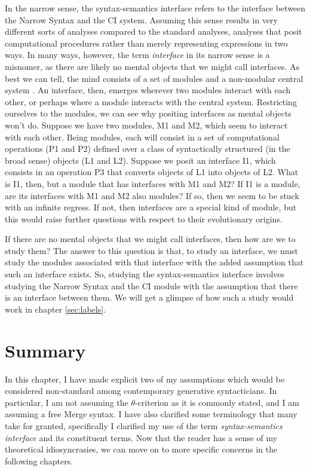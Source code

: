\documentclass[MilwayThesis]{subfiles}
\begin{document}
In the narrow sense, the syntax-semantics interface refers to the interface between the Narrow Syntax and the CI system.
Assuming this sense results in very different sorts of analyses compared to the standard analyses, analyses that posit computational procedures rather than merely representing expressions in two ways.
In many ways, however, the term \textit{interface} in its narrow sense is a misnomer, as there are likely no mental objects that we might call interfaces.
As best we can tell, the mind consists of a set of modules and a non-modular central system \parencite{fodor1983modularity,fodor2001mind}.
An interface, then, emerges wherever two modules interact with each other, or perhaps where a module interacts with the central system.
Restricting ourselves to the modules, we can see why positing interfaces as mental objects won't do.
Suppose we have two modules, M1 and M2, which seem to interact with each other.
Being modules, each will consist in a set of computational operations (P1 and P2) defined over a class of syntactically structured (in the broad sense) objects (L1 and L2).
Suppose we posit an interface I1, which consists in an operation P3 that converts objects of L1 into objects of L2.
What is I1, then, but a module that has interfaces with M1 and M2?
If I1 is a module, are its interfaces with M1 and M2 also modules?
If so, then we seem to be stuck with an infinite regress.
If not, then interfaces are a special kind of module, but this would raise further questions with respect to their evolutionary origins.

If there are no mental objects that we might call interfaces, then how are we to study them?
The answer to this question is that, to study an interface, we must study the modules associated with that interface with the added assumption that such an interface exists.
So, studying the syntax-semantics interface involves studying the Narrow Syntax and the CI module with the assumption that there is an interface between them.
We will get a glimpse of how such a study would work in chapter \ref{sec:labels}.

\section{Summary}
In this chapter, I have made explicit two of my assumptions which would be considered non-standard among contemporary generative syntacticians.
In particular, I am not assuming the $\theta$-criterion as it is commonly stated, and I am assuming a free Merge syntax.
I have also clarified some terminology that many take for granted, specifically I clarified my use of the term \textit{syntax-semantics interface} and its constituent terms.
Now that the reader has a sense of my theoretical idiosyncrasies, we can move on to more specific concerns in the following chapters.
\end{document}
